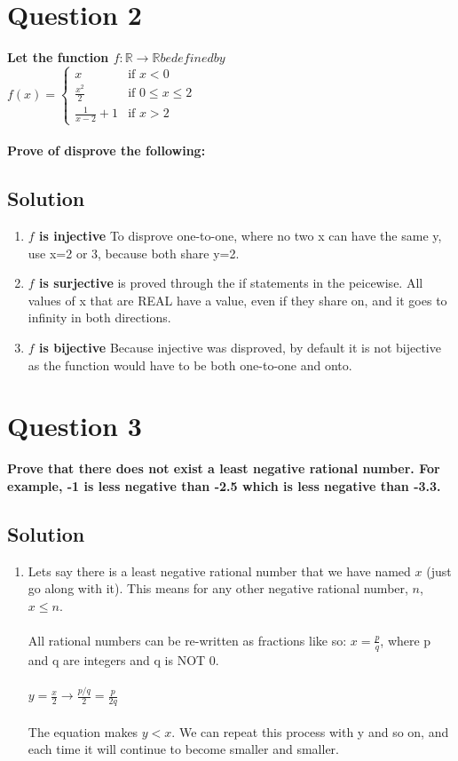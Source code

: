 \documentclass[11pt]{article}
\begin{document}
\clearpage
\section*{Question 2}
    \textbf{Let the function \(f: \mathbb{R} \rightarrow \mathbb{R} be defined by\) \\
    \(f(x) = \begin{cases}
        x & \text{if } x <0 \\
        \frac{x^2}{2} & \text{if } 0 \leq x \leq 2 \\
        \frac{1}{x-2}+1 & \text{if } x> 2
    \end{cases}\) \\ \\
    Prove of disprove the following:}
    \subsection*{Solution}
    \begin{enumerate}[label=(\alph*)]
        \item \textbf{\(f\) is injective} To disprove one-to-one, where no two x can have the same y, use x=2 or 3, because both share y=2.
        \item \textbf{\(f\) is surjective} is proved through the if statements in the peicewise. All values of x that are REAL have a value, even if they share on, and it goes to infinity in both directions.
        \item \textbf{\(f\) is bijective} Because injective was disproved, by default it is not bijective as the function would have to be both one-to-one and onto. 
    \end{enumerate}
    
\clearpage
\section*{Question 3}
    \textbf{Prove that there does not exist a least negative rational number. For example, -1 is less negative than -2.5 which is less negative than -3.3.}
    \subsection*{Solution}
    \begin{enumerate}[label=(\alph*)]
        \item[] Lets say there is a least negative rational number that we have named \(x\) (just go along with it). This means for any other negative rational number, \(n\), \(x \leq n\). \\ \\
        All rational numbers can be re-written as fractions like so: \(x = \frac{p}{q}\), where p and q are integers and q is NOT 0.\\ \\
        \(y=\frac{x}{2} \rightarrow \frac{p/q}{2} = \frac{p}{2q} \) \\ \\
        The equation makes \(y < x\). We can repeat this process with y and so on, and each time it will continue to become smaller and smaller.
        
    \end{enumerate}
\end{document}
